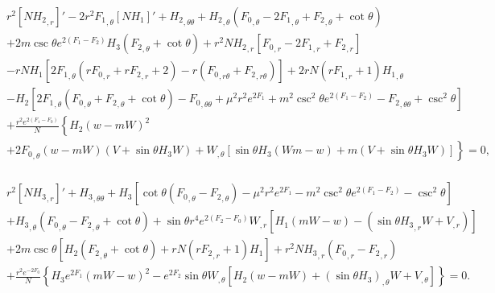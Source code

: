 
\begin{eqnarray}   
&& 
r^2 [N {H_2}_{,r}]'
-2 r^2 {F_1}_{,\theta} [N{H_1}]'
+{H_2}_{,\theta\theta}
+ {H_2}_{,\theta} \left({F_0}_{,\theta}-2 {F_1}_{,\theta}+{F_2}_{,\theta}+\cot\theta\right)
\nonumber \\
%
&&
+2 {m} \csc \theta e^{2 ({F_1}-F_2)} {H_3} \left({F_2}_{,\theta}
+\cot \theta\right) 
+r^2 N {H_2}_{,r} \left[{F_0}_{,r} 
-2 {F_1}_{,r} 
+{F_2}_{,r} \right]
\nonumber \\
%
&&
-rN{H_1} \left[2 {F_1}_{,\theta} \left(r {F_0}_{,r}+r {F_2}_{,r}+2\right) 
-r \left({F_0}_{,r\theta}+{F_2}_{,r\theta}\right)\right]
+2rN \left(r {F_1}_{,r}+1\right) {H_1}_{,\theta}
\nonumber \\
%
&&
- H_2 \left[2 {F_1}_{,\theta} 
\left({F_0}_{,\theta}+{F_2}_{,\theta}+\cot \theta\right)
-{F_0}_{,\theta\theta} +{\mu^2} r^2 e^{2 
{F_1}}+{m}^2 \csc ^2\theta e^{2( 
{F_1}-F_2)}- {F_2}_{,\theta\theta}+\csc ^2\theta \right] \nonumber \\
%
&&
+\frac{r^2 e^{2 ({F_1}-F_0)} }{N}
\left\{ {H_2} (w-{m} W)^2 
 \right. \nonumber \\
%
&&
\left.
+2{F_0}_{,\theta}(w-mW)(V+\sin\theta H_3W)+W_{,\theta}[\sin \theta {H_3}(Wm-w)+m(V+\sin \theta {H_3}W)]\right\} =0,  \nonumber \\
&&
\end{eqnarray}




\begin{eqnarray}
&&
r^2 [N  {H_3}_{,r}]'
+{H_3}_{,\theta\theta}+ {H_3} 
 \left[
  \cot \theta ({F_0}_{,\theta} -{F_2}_{,\theta})
 - {\mu^2} r^2 e^{2 {F_1}}
 - {m}^2 \csc ^2\theta e^{2( 
{F_1}-F_2)}
-\csc ^2\theta 
\right] 
  \nonumber \\
%
&&
+{H_3}_{,\theta} \left({F_0}_{,\theta}-{F_2}_{,\theta}+\cot \theta\right)
+\sin\theta r^4e^{2 ({F_2}-F_0)}W_{,r}[
   {H_1}(m W 
- w)   
-( \sin \theta  {H_3}_{,r} W 
+ V_{,r}) ]
  \nonumber \\
%
&&
+2 {m} \csc \theta [
{H_2} 
\left({F_2}_{,\theta}+\cot \theta\right) 
+ rN 
\left(r {F_2}_{,r}+1\right) {H_1}]
+ r^2N{H_3}_{,r} \left({F_0}_{,r} 
-{F_2}_{,r}\right)
\nonumber \\
&&+\frac{ r^2e^{-2F_0} }{N} 
\left\{
{H_3}e^{2 {F_1}} \left({m}  W-w \right)^2 
- e^{2 {F_2}}\sin\theta W_{,\theta} [
 {H_2} (w-{m} W)+(\sin \theta
{H_3})_{,\theta} W+V_{,\theta}]\right\}=0 .
\nonumber \\
&&
\end{eqnarray}

